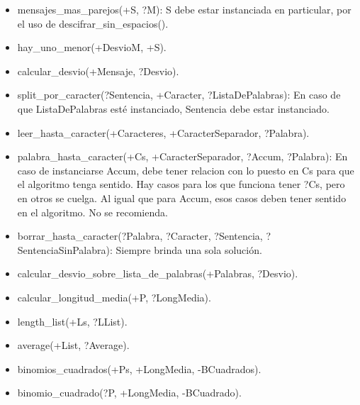 \documentclass[spanish, 10pt,a4paper]{article}
\numberwithin{equation}{section} %
\begin{document}
\begin{itemize}
\item mensajes\_mas\_parejos(+S, ?M): S debe estar instanciada en particular, por el uso de descifrar\_sin\_espacios(). 
\item hay\_uno\_menor(+DesvioM, +S).
\item calcular\_desvio(+Mensaje, ?Desvio).
\item split\_por\_caracter(?Sentencia, +Caracter, ?ListaDePalabras): En caso de que ListaDePalabras esté instanciado, Sentencia debe estar instanciado.
\item leer\_hasta\_caracter(+Caracteres, +CaracterSeparador, ?Palabra).
\item palabra\_hasta\_caracter(+Cs, +CaracterSeparador, ?Accum, ?Palabra): En caso de instanciarse Accum, debe tener relacion con lo puesto en Cs para que el algoritmo tenga sentido. Hay casos para los que funciona tener ?Cs, pero en otros se cuelga. Al igual que para Accum, esos casos deben tener sentido en el algoritmo. No se recomienda.
\item borrar\_hasta\_caracter(?Palabra, ?Caracter, ?Sentencia, ?SentenciaSinPalabra): Siempre brinda una sola solución. 
\item calcular\_desvio\_sobre\_lista\_de\_palabras(+Palabras, ?Desvio).
\item calcular\_longitud\_media(+P, ?LongMedia).
\item length\_list(+Ls, ?LList).
\item average(+List, ?Average).
\item binomios\_cuadrados(+Ps, +LongMedia, -BCuadrados).
\item binomio\_cuadrado(?P, +LongMedia, -BCuadrado).  
\end{itemize}
\end{document}

